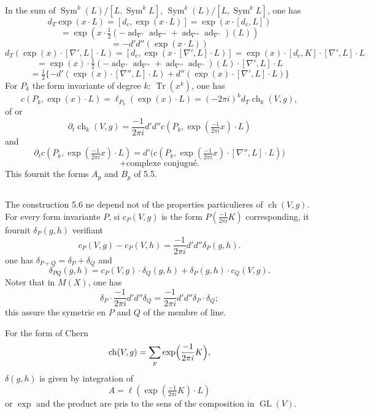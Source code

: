 \documentclass[12pt,a4paper]{article}
\theoremstyle{plain}
\theoremstyle{definition}
\DeclareMathOperator{\Tr}{Tr}
\DeclareMathOperator{\ch}{ch}
\DeclareMathOperator{\Sym}{Sym}
\DeclareMathOperator{\ad}{ad}
\DeclareMathOperator{\GL}{GL}
\begin{document}
In the sum of $\Sym^k(L)/[L, \Sym^k L]$, $\Sym^k(L)/[L, \Sym^k L]$, one has
\[
d_T \exp(x \cdot L) = [d_c, \exp(x \cdot L)] = \exp(x \cdot [d_c, L])
\]
\[
= \exp(x \cdot \tfrac{1}{2}(-\ad_{\nabla'} \ad_{\nabla''} + \ad_{\nabla''} \ad_{\nabla'})(L))
\]
\[
= -d'd''(\exp(x \cdot L))
\]
\[
d_T(\exp(x) \cdot [\nabla', L] \cdot L) = [d_c, \exp(x \cdot [\nabla', L] \cdot L)] = \exp(x) \cdot [d_c, K] \cdot [\nabla', L] \cdot L
\]
\[
= \exp(x) \cdot \tfrac{1}{2}(-\ad_{\nabla'} \ad_{\nabla''} + \ad_{\nabla''} \ad_{\nabla'})(L) \cdot [\nabla', L] \cdot L
\]
\[
= \tfrac{1}{2}\{-d'(\exp(x) \cdot [\nabla'', L] \cdot L) + d''(\exp(x) \cdot [\nabla', L] \cdot L)\}
\]
For $P_k$ the form invariante of degree $k$: $\Tr(x^k)$, one has
\[
c(P_k, \exp(x) \cdot L) = \ell_{P_k}(\exp(x) \cdot L) = (-2\pi i)^k d_T \ch_k(V, g) ,
\]
of or
\[
\partial_t \ch_k(V, g) = \frac{-1}{2\pi i} d'd'' c(P_k, \exp(\tfrac{-1}{2\pi i} x) \cdot L)
\]
and
\[
\partial_t c(P_k, \exp(\tfrac{-1}{2\pi i} x) \cdot L) = d'\bigl(c(P_k, \exp(\tfrac{-1}{2\pi i} x) \cdot [\nabla'', L] \cdot L)\bigr)
\]
\[
+ \text{complexe conjugu\'e.}
\]
This fournit the forms $A_p$ and $B_p$ of 5.5.

\subsection{}

The construction 5.6 ne depend not of the properties particulieres of
$\ch(V, g)$. For every form invariante $P$, si $c_P(V, g)$ is the form $P(\frac{-1}{2\pi i} K)$
corresponding, it fournit $\delta_P(g, h)$ verifiant
\[
c_P(V, g) - c_P(V, h) = \frac{-1}{2\pi i} d'd'' \delta_P(g, h) .
\]
one has $\delta_{P+Q} = \delta_P + \delta_Q$ and
\begin{equation}\label{eq:5.7.1}
\delta_{PQ}(g, h) = c_P(V, g) \cdot \delta_Q(g, h) + \delta_P(g, h) \cdot c_Q(V, g) .
\end{equation}
Noter that in $M(X)$, one has
\begin{equation}\label{eq:5.7.2}
\delta_P \cdot \frac{-1}{2\pi i} d'd'' \delta_Q = \frac{-1}{2\pi i} d'd'' \delta_P \cdot \delta_Q ;
\end{equation}
this assure the symetrie en $P$ and $Q$ of the membre of line.

For the form of Chern
\[
\ch(V, g) = \sum_p \exp\Bigl(\frac{-1}{2\pi i} K\Bigr) ,
\]
$\delta(g, h)$ is given by integration of
\[
A = \ell(\exp(\tfrac{-1}{2\pi i} K) \cdot L)
\]
or $\exp$ and the product are pris to the sens of the composition in $\GL(V)$.
\end{document}
